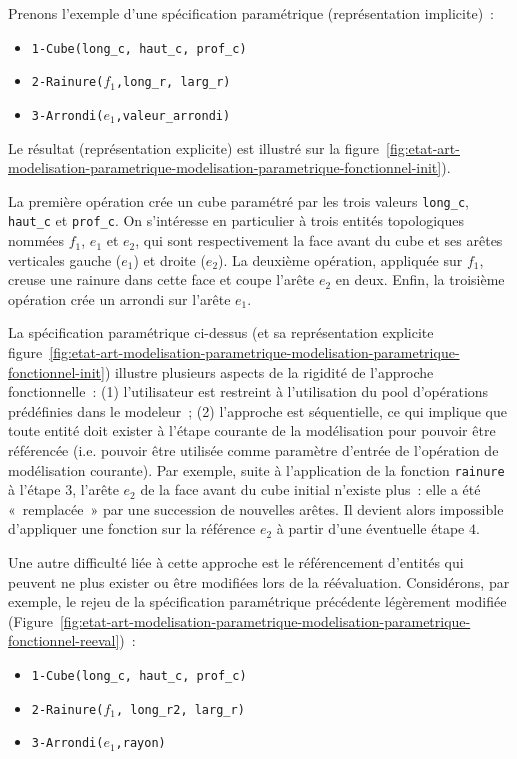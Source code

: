 Prenons l'exemple d'une spécification paramétrique (représentation implicite)~: %
\begin{itemize}
	\item \texttt{1-Cube(long\_c, haut\_c, prof\_c)}
	\item \texttt{2-Rainure($f_{1}$,long\_r, larg\_r)}
	\item \texttt{3-Arrondi($e_{1}$,valeur\_arrondi)}
\end{itemize}



Le résultat (représentation explicite) est illustré sur la
figure~\ref{fig:etat-art-modelisation-parametrique-modelisation-parametrique-fonctionnel-init}). %

La première opération crée un cube paramétré par les trois valeurs
\texttt{long\_c}, \texttt{haut\_c} et \texttt{prof\_c}. %
On s'intéresse en particulier à trois entités topologiques nommées $f_{1}$, $e_{1}$ et $e_{2}$, qui
sont respectivement la face avant du cube et ses arêtes verticales gauche
($e_{1}$) et droite ($e_{2}$). %
La deuxième opération, appliquée sur $f_{1}$, creuse une rainure dans cette face et coupe l'arête $e_{2}$
en deux. %
Enfin, la troisième opération crée un arrondi sur l'arête $e_{1}$. %



La spécification paramétrique ci-dessus (et sa représentation explicite
figure~\ref{fig:etat-art-modelisation-parametrique-modelisation-parametrique-fonctionnel-init})
illustre plusieurs aspects de la rigidité de l'approche fonctionnelle~: %
(1) l'utilisateur est restreint à l'utilisation du pool d'opérations prédéfinies dans le modeleur~; (2) l'approche est
séquentielle, ce qui implique que toute entité doit exister à l'étape courante de la modélisation pour pouvoir être référencée (i.e. pouvoir être utilisée comme paramètre d'entrée de l'opération de modélisation courante).
Par exemple, suite à l'application de la fonction \texttt{rainure} à l'étape $3$, l'arête $e_{2}$ de
la face avant du cube initial n'existe plus~: elle a été «~remplacée~» par une
succession de nouvelles arêtes. Il devient alors impossible d'appliquer une fonction
sur la référence $e_{2}$ à partir d'une éventuelle étape $4$. %




Une autre difficulté liée à cette approche est le référencement d'entités qui peuvent ne plus exister ou être modifiées lors de la réévaluation. %
Considérons, par exemple, le rejeu de la spécification paramétrique précédente légèrement modifiée
(Figure~\ref{fig:etat-art-modelisation-parametrique-modelisation-parametrique-fonctionnel-reeval})~:
\begin{itemize}
	\item \texttt{1-Cube(long\_c, haut\_c, prof\_c)}
	\item \texttt{2-Rainure($f_{1}$, long\_r2, larg\_r)}
	\item \texttt{3-Arrondi($e_{1}$,rayon)} %
\end{itemize} %


